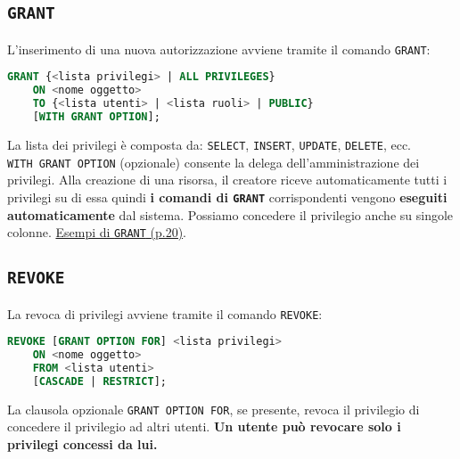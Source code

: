 \documentclass[12pt]{article}
\begin{document}
\subsection{\texttt{GRANT}}
L'inserimento di una nuova autorizzazione avviene tramite il comando \texttt{GRANT}:
\begin{lstlisting}[language=SQL]
    GRANT {<lista privilegi> | ALL PRIVILEGES}
    ON <nome oggetto>
    TO {<lista utenti> | <lista ruoli> | PUBLIC}
    [WITH GRANT OPTION];
\end{lstlisting}
La lista dei privilegi è composta da: \texttt{SELECT}, \texttt{INSERT}, \texttt{UPDATE}, \texttt{DELETE}, ecc.\\ 
\texttt{WITH GRANT OPTION} (opzionale) consente la delega dell'amministrazione dei privilegi.
Alla creazione di una risorsa, il creatore riceve automaticamente tutti i privilegi su di essa quindi \textbf{i comandi di \texttt{GRANT}} corrispondenti vengono \textbf{eseguiti automaticamente} dal sistema.
Possiamo concedere il privilegio anche su singole colonne.
\href{https://2023.aulaweb.unige.it/pluginfile.php/352748/mod_resource/content/4/03A-controlloAccesso-23-24.pdf}{Esempi di \texttt{GRANT} (p.20)}.
\subsection{\texttt{REVOKE}}
La revoca di privilegi avviene tramite il comando \texttt{REVOKE}:
\begin{lstlisting}[language=SQL]
    REVOKE [GRANT OPTION FOR] <lista privilegi>
    ON <nome oggetto>
    FROM <lista utenti>
    [CASCADE | RESTRICT];
\end{lstlisting}
La clausola opzionale \texttt{GRANT OPTION FOR}, se presente, revoca il privilegio di concedere il privilegio ad altri utenti. \textbf{Un utente può revocare solo i privilegi concessi da lui.}
\end{document}

